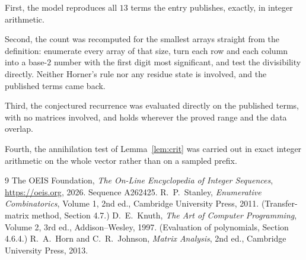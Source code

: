 \documentclass[11pt,a4paper]{article}
\theoremstyle{plain}
\theoremstyle{definition}
\begin{document}
First, the model reproduces all $13$ terms the entry publishes, exactly, in integer
arithmetic.

Second, the count was recomputed for the smallest arrays straight from the definition:
enumerate every array of that size, turn each row and each column into a base-$2$ number with
the first digit most significant, and test the divisibility directly. Neither Horner's rule nor
any residue state is involved, and the published terms came back.

Third, the conjectured recurrence was evaluated directly on the published terms, with no
matrices involved, and holds wherever the proved range and the data overlap.

Fourth, the annihilation test of Lemma~\ref{lem:crit} was carried out in exact integer
arithmetic on the whole vector rather than on a sampled prefix.

\begin{thebibliography}{9}
 The OEIS Foundation, \emph{The On-Line Encyclopedia of Integer
Sequences}, \url{https://oeis.org}, 2026. Sequence A262425.
 R.~P.~Stanley, \emph{Enumerative Combinatorics}, Volume 1, 2nd ed.,
Cambridge University Press, 2011. (Transfer-matrix method, Section 4.7.)
 D.~E.~Knuth, \emph{The Art of Computer Programming}, Volume 2, 3rd ed.,
Addison--Wesley, 1997. (Evaluation of polynomials, Section 4.6.4.)
 R.~A.~Horn and C.~R.~Johnson, \emph{Matrix Analysis}, 2nd ed., Cambridge
University Press, 2013.
\end{thebibliography}
\end{document}
